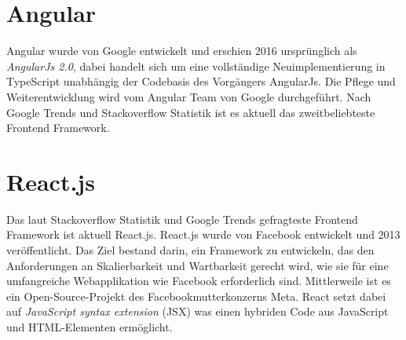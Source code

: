 \section{Angular}
Angular wurde von Google entwickelt und erschien 2016 ursprünglich als \emph{AngularJs 2.0},
dabei handelt sich um eine vollständige Neuimplementierung in TypeScript unabhängig der Codebasis des Vorgängers AngularJs.
Die Pflege und Weiterentwicklung wird vom Angular Team von Google durchgeführt.\cite[S. 209-210]{bin2019}
Nach Google Trends und Stackoverflow Statistik ist es aktuell das zweitbeliebteste
Frontend Framework. \cite{googleTrends} \cite{stackoverflowStats}

\section{React.js}
Das laut Stackoverflow Statistik und Google Trends gefragteste Frontend Framework ist aktuell React.js.\cite{googleTrends} \cite{stackoverflowStats}
React.js wurde von Facebook entwickelt und 2013 veröffentlicht.
Das Ziel bestand darin, ein Framework zu entwickeln,
das den Anforderungen an Skalierbarkeit und Wartbarkeit gerecht wird,
wie sie für eine umfangreiche Webapplikation wie Facebook erforderlich sind. \cite[S. 1]{gackenheimer2015introduction}
Mittlerweile ist es ein Open-Source-Projekt des Facebookmutterkonzerns Meta.
React setzt dabei auf \emph{JavaScript syntax extension} (JSX) was einen hybriden Code aus JavaScript und HTML-Elementen ermöglicht. \cite{react}


